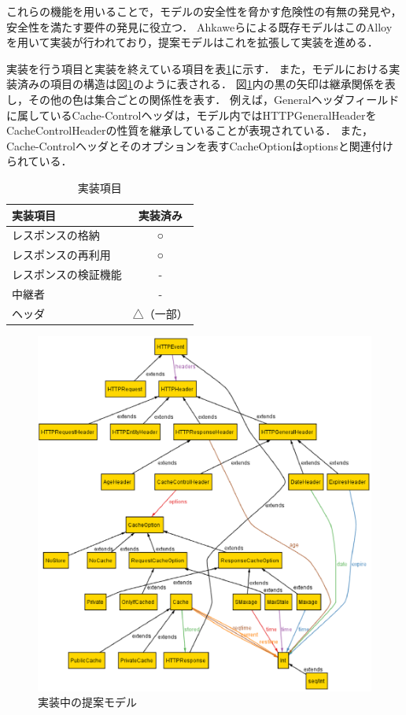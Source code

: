 \documentclass{css}
\begin{document}
これらの機能を用いることで，モデルの安全性を脅かす危険性の有無の発見や，安全性を満たす要件の発見に役立つ．
Ahkaweらによる既存モデル\cite{webmodel}はこのAlloyを用いて実装が行われており，提案モデルはこれを拡張して実装を進める．

実装を行う項目と実装を終えている項目を表\ref{tb:model_implement}に示す．
また，モデルにおける実装済みの項目の構造は図\ref{fig:model_alloy}のように表される．
図\ref{fig:model_alloy}内の黒の矢印は継承関係を表し，その他の色は集合ごとの関係性を表す．
例えば，Generalヘッダフィールドに属しているCache-Controlヘッダは，モデル内ではHTTPGeneralHeaderをCacheControlHeaderの性質を継承していることが表現されている．
また，Cache-Controlヘッダとそのオプションを表すCacheOptionはoptionsと関連付けられている．

\begin{table}[htb]
\centering
\caption{実装項目}
\label{tb:model_implement}
\begin{tabular}{l|c}
実装項目 & 実装済み \\ \hline
レスポンスの格納 & ○ \\
レスポンスの再利用 & ○ \\
レスポンスの検証機能 & - \\
中継者 & - \\
ヘッダ & △（一部） \\
\end{tabular}
\end{table}

\begin{figure}[htb]
\centering
\includegraphics[width=1.0\hsize]{model_alloy.eps}
\caption{実装中の提案モデル}
\label{fig:model_alloy}
\end{figure}
\end{document}
